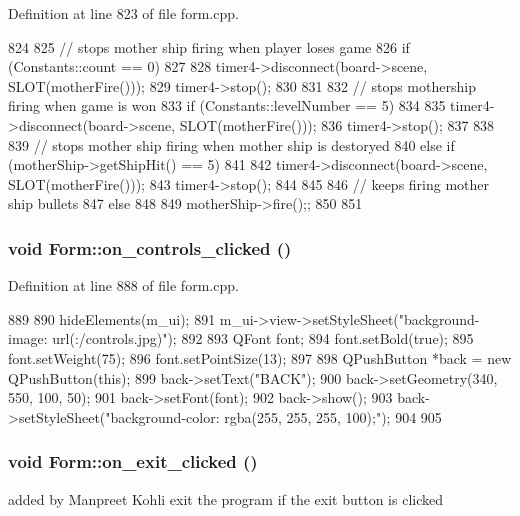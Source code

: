 Definition at line 823 of file form.cpp.


\begin{DoxyCode}
824 {
825     // stops mother ship firing when player loses game
826     if (Constants::count == 0)
827     {
828         timer4->disconnect(board->scene, SLOT(motherFire()));
829         timer4->stop();
830     }
831 
832     // stops mothership firing when game is won
833     if (Constants::levelNumber == 5)
834     {
835         timer4->disconnect(board->scene, SLOT(motherFire()));
836         timer4->stop();
837     }
838 
839     // stops mother ship firing when mother ship is destoryed
840     else if (motherShip->getShipHit() == 5)
841     {
842         timer4->disconnect(board->scene, SLOT(motherFire()));
843         timer4->stop();
844     }
845 
846     // keeps firing mother ship bullets
847     else
848     {
849         motherShip->fire();;
850     }
851 }
\end{DoxyCode}
\hypertarget{class_form_a5d619b8452dcafe406e6143c8de29169}{
\subsubsection[{on\_\-controls\_\-clicked}]{\setlength{\rightskip}{0pt plus 5cm}void Form::on\_\-controls\_\-clicked ()}}
\label{class_form_a5d619b8452dcafe406e6143c8de29169}


Definition at line 888 of file form.cpp.


\begin{DoxyCode}
889 {
890     hideElements(m_ui);
891     m_ui->view->setStyleSheet("background-image: url(:/controls.jpg)");
892 
893     QFont font;
894     font.setBold(true);
895     font.setWeight(75);
896     font.setPointSize(13);
897 
898     QPushButton *back = new QPushButton(this);
899     back->setText("BACK");
900     back->setGeometry(340, 550, 100, 50);
901     back->setFont(font);
902     back->show();
903     back->setStyleSheet("background-color: rgba(255, 255, 255, 100);");
904 
905 }
\end{DoxyCode}
\hypertarget{class_form_ac7feff0f4e7f4872f0692b2f3d5854c2}{
\subsubsection[{on\_\-exit\_\-clicked}]{\setlength{\rightskip}{0pt plus 5cm}void Form::on\_\-exit\_\-clicked ()}}
\label{class_form_ac7feff0f4e7f4872f0692b2f3d5854c2}
added by Manpreet Kohli exit the program if the exit button is clicked 

